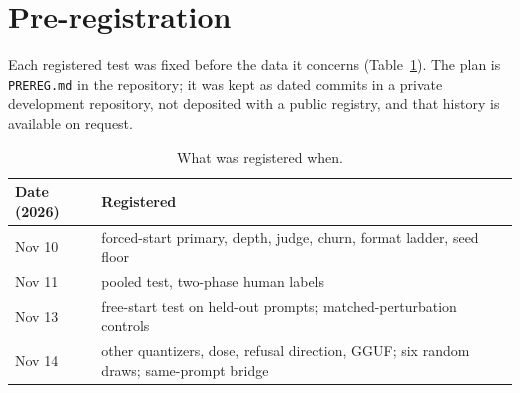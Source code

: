\section{Pre-registration}
\label{app:prereg}
Each registered test was fixed before the data it concerns (Table~\ref{tab:prereg}). The plan is \texttt{PREREG.md} in the repository; it was kept as dated commits in a private development repository, not deposited with a public registry, and that history is available on request.

\begin{table}[h]
\centering\small
\begin{tabular}{@{}lp{}@{}}
\toprule
Date (2026) & Registered \\
\midrule
Nov 10 & forced-start primary, depth, judge, churn, format ladder, seed floor \\
Nov 11 & pooled test, two-phase human labels \\
Nov 13 & free-start test on held-out prompts; matched-perturbation controls \\
Nov 14 & other quantizers, dose, refusal direction, GGUF; six random draws; same-prompt bridge \\
\bottomrule
\end{tabular}
\caption{What was registered when.}
\label{tab:prereg}
\end{table}

